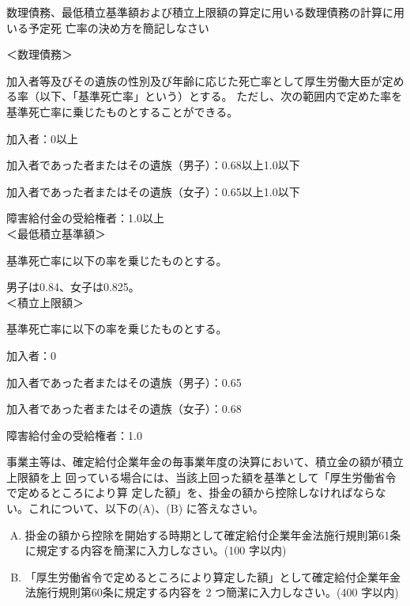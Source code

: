 \begin{shortanswer}[年金2 H29 問題2(2)\textcircled{1}]
  数理債務、最低積立基準額および積立上限額の算定に用いる数理債務の計算に用いる予定死
亡率の決め方を簡記しなさい
\end{shortanswer}

\begin{answerbox}
  ＜数理債務＞

  加入者等及びその遺族の性別及び年齢に応じた死亡率として厚生労働大臣が定める率（以下、「基準死亡率」という）とする。
ただし、次の範囲内で定めた率を基準死亡率に乗じたものとすることができる。

加入者：0以上

加入者であった者またはその遺族（男子）：0.68以上1.0以下

加入者であった者またはその遺族（女子）：0.65以上1.0以下

障害給付金の受給権者：1.0以上
\\

＜最低積立基準額＞

基準死亡率に以下の率を乗じたものとする。

男子は0.84、女子は0.825。
\\

＜積立上限額＞

基準死亡率に以下の率を乗じたものとする。

加入者：0

加入者であった者またはその遺族（男子）：0.65

加入者であった者またはその遺族（女子）：0.68

障害給付金の受給権者：1.0

\end{answerbox}

\begin{shortanswer}[年金2 2024 問題2(3)]
  事業主等は、確定給付企業年金の毎事業年度の決算において、積立金の額が積立上限額を上
  回っている場合には、当該上回った額を基準として「厚生労働省令で定めるところにより算
  定した額」を、掛金の額から控除しなければならない。これについて、以下の(A)、(B)
  に答えなさい。
\\
  \begin{enumerate}[(A)]
    \item 掛金の額から控除を開始する時期として確定給付企業年金法施行規則第61条に規定する内容を簡潔に入力しなさい。(100 字以内)
    \\
    \item 「厚生労働省令で定めるところにより算定した額」として確定給付企業年金法施行規則第60条に規定する内容を 2 つ簡潔に入力しなさい。(400 字以内)
  \end{enumerate}
\end{shortanswer}

